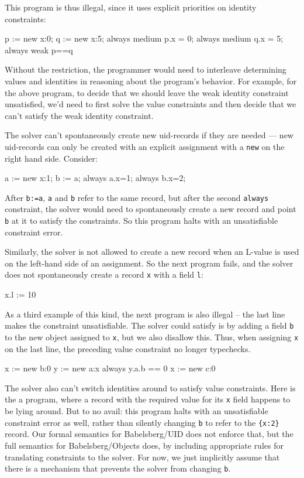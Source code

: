 \documentclass{article}
\begin{document}
This program is thus illegal, since it uses explicit priorities on
identity constraints:
\begin{example}
p := new {x:0};
q := new {x:5};
always medium p.x = 0;
always medium q.x = 5;
always weak p==q
\end{example}

Without the restriction, the programmer would need to interleave
determining values and identities in reasoning about the program's
behavior.  For example, for the above program, to decide that we
should leave the weak identity constraint unsatisfied, we'd need to
first solve the value constraints and then decide that we can't
satisfy the weak identity constraint.

The solver can't spontaneously create new uid-records if they are needed
--- new uid-records can only be created with an explicit assignment with a
\verb|new| on the right hand side.  Consider:
\begin{example}
a := new {x:1};
b := a;
always a.x=1;
always b.x=2;
\end{example}

After \verb|b:=a|, \texttt{a} and \texttt{b} refer to the same record, but
after the second \texttt{always} constraint, the solver would need to
spontaneously create a new record and point \texttt{b} at it to satisfy
the constraints.  So this program halts with an unsatisfiable
constraint error.

Similarly, the solver is not allowed to create a new record when an
L-value is used on the left-hand side of an assignment. So the next
program fails, and the solver does not spontaneously create a record
\verb!x! with a field \verb!l!:
\begin{example}
x.l := 10
\end{example}

As a third example of this kind, the next program is also illegal --
the last line makes the constraint unsatisfiable. The solver could
satisfy is by adding a field \verb!b! to the new object assigned to
\verb!x!, but we also disallow this. Thus, when assigning \verb!x! on
the last line, the preceding value constraint no longer typechecks.
\begin{example}
x := new {b:0}
y := new {a:x}
always y.a.b == 0
x := new {c:0}
\end{example}

The solver also can't switch identities around to satisfy value
constraints.  Here is the a program, where a record with the required
value for its \verb|x| field happens to be lying around.  But to no
avail: this program halts with an unsatisfiable constraint error as
well, rather than silently changing \verb|b| to refer to the
\verb|{x:2}| record.  Our formal semantics for Babelsberg/UID does not
enforce that, but the full semantics for Babelsberg/Objects does, by
including appropriate rules for translating constraints to the solver.
For now, we just implicitly assume that there is a mechanism that
prevents the solver from changing \verb|b|.
\end{document}
